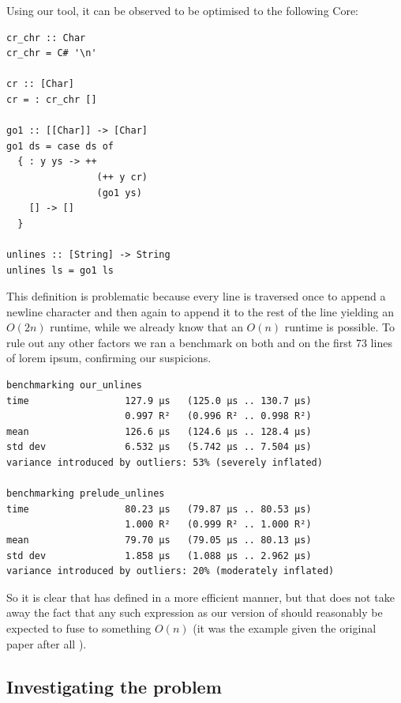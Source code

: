 Using our tool, it can be observed to be optimised to the following Core:

\begin{listing}[H]
\begin{verbatim}
cr_chr :: Char
cr_chr = C# '\n'

cr :: [Char]
cr = : cr_chr []

go1 :: [[Char]] -> [Char]
go1 ds = case ds of
  { : y ys -> ++
                (++ y cr)
                (go1 ys)
    [] -> []
  }

unlines :: [String] -> String
unlines ls = go1 ls
\end{verbatim}
\end{listing}

This definition is problematic because every line is traversed once to append a newline character and then again to append it to the rest of the line
yielding an $O(2n)$ runtime, while we already know that an $O(n)$ runtime is possible. To rule out any other factors we ran a benchmark on both
 and  on the first 73 lines of lorem ipsum, confirming our suspicions.

\begin{listing}[H]
\begin{verbatim}
benchmarking our_unlines
time                 127.9 μs   (125.0 μs .. 130.7 μs)
                     0.997 R²   (0.996 R² .. 0.998 R²)
mean                 126.6 μs   (124.6 μs .. 128.4 μs)
std dev              6.532 μs   (5.742 μs .. 7.504 μs)
variance introduced by outliers: 53% (severely inflated)

benchmarking prelude_unlines
time                 80.23 μs   (79.87 μs .. 80.53 μs)
                     1.000 R²   (0.999 R² .. 1.000 R²)
mean                 79.70 μs   (79.05 μs .. 80.13 μs)
std dev              1.858 μs   (1.088 μs .. 2.962 μs)
variance introduced by outliers: 20% (moderately inflated)
\end{verbatim}
\end{listing}

So it is clear that  has defined  in a more efficient manner, but that does not take away the fact that any such
expression as our version of  should reasonably be expected to fuse to something $O(n)$ (it was the example given the original paper after all \cite{shortcut_fusion}).

\subsection{Investigating the problem}

